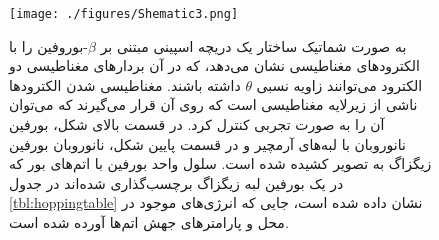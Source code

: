 \begin{figure}
  \centering
  \texttt{[image: ./figures/Shematic3.png]}
\caption{به صورت شماتیک ساختار یک دریچه اسپینی مبتنی بر $\beta$-بوروفین را با الکترودهای مغناطیسی نشان ‌‌می‌‌دهد، که در آن بردارهای مغناطیسی دو الکترود ‌‌می‌‌توانند زاویه نسبی $\theta$ داشته باشند. مغناطیسی شدن الکترودها ناشی از زیرلایه مغناطیسی است که روی آن قرار ‌‌می‌‌گیرند که ‌‌می‌‌توان آن را به صورت تجربی کنترل کرد. در قسمت بالای شکل، ‌بورفین نانوروبان با لبه‌های آرمچیر و در قسمت پایین شکل، نانوروبان ‌بورفین زیگزاگ به تصویر کشیده شده است. سلول واحد ‌بورفین با اتم‌های بور که در یک بورفین لبه زیگزاگ برچسب‌گذاری شده‌اند در جدول \ref{tbl:hoppingtable} نشان داده شده است، جایی که انرژی‌های موجود در محل و پارامترهای جهش اتم‌ها آورده شده است.}
  \label{fig:model}
\end{figure}
    

